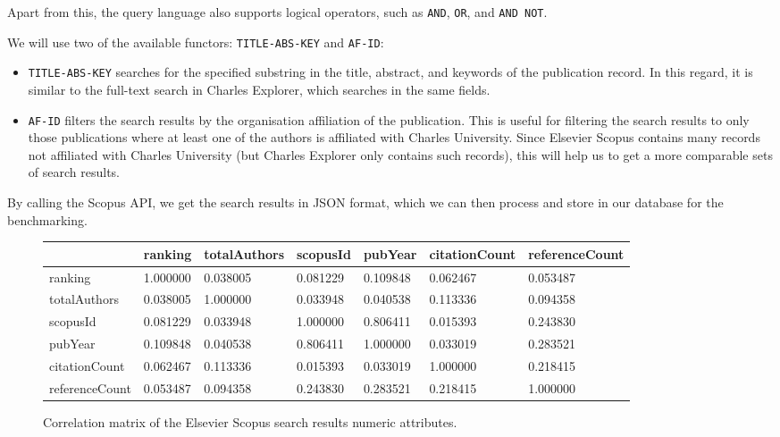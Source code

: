Apart from this, the query language also supports logical operators, such as \texttt{AND}, \texttt{OR}, and \texttt{AND NOT}.

We will use two of the available functors: \texttt{TITLE-ABS-KEY} and \texttt{AF-ID}:

\begin{itemize}
    \item \texttt{TITLE-ABS-KEY} searches for the specified substring in the title, abstract, and keywords of the publication record. 
    In this regard, it is similar to the full-text search in Charles Explorer, which searches in the same fields.
    \item \texttt{AF-ID} filters the search results by the organisation affiliation of the publication. This is useful for filtering the search results to only those publications where at least one of the authors is affiliated with Charles University. Since Elsevier Scopus contains many records not affiliated with Charles University (but Charles Explorer only contains such records), this will help us to get a more comparable sets of search results.
\end{itemize}

By calling the Scopus API, we get the search results in JSON format, which we can then process and store in our database for the benchmarking.

\begin{figure}[ht!]
        \scriptsize
        \centering
        \begin{tabular}{|l|l|l|l|l|l|l|}
        \hline
            ~ & ranking & totalAuthors & scopusId & pubYear & citationCount & referenceCount \\ \hline
            ranking & 1.000000 & 0.038005 & 0.081229 & 0.109848 & 0.062467 & 0.053487 \\ \hline
            totalAuthors & 0.038005 & 1.000000 & 0.033948 & 0.040538 & 0.113336 & 0.094358 \\ \hline
            scopusId & 0.081229 & 0.033948 & 1.000000 & 0.806411 & 0.015393 & 0.243830 \\ \hline
            pubYear & 0.109848 & 0.040538 & 0.806411 & 1.000000 & 0.033019 & 0.283521 \\ \hline
            citationCount & 0.062467 & 0.113336 & 0.015393 & 0.033019 & 1.000000 & 0.218415 \\ \hline
            referenceCount & 0.053487 & 0.094358 & 0.243830 & 0.283521 & 0.218415 & 1.000000 \\ \hline
        \end{tabular}
    \caption{Correlation matrix of the Elsevier Scopus search results numeric attributes.} 
\end{figure}

